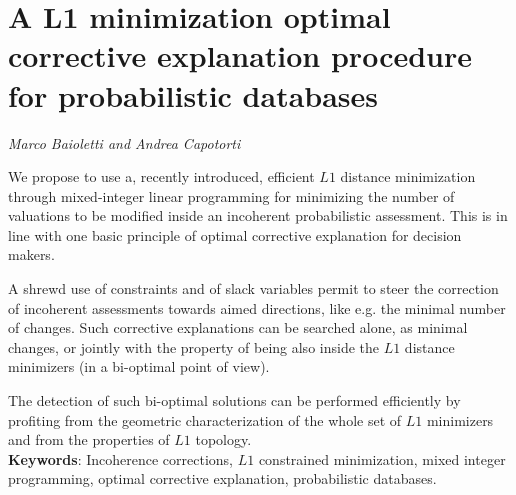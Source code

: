\documentclass[../booklet.tex]{subfiles}
\begin{document}
\section[A  L1 minimization optimal corrective explanation procedure for probabilistic databases. {\it Marco Baioletti and Andrea Capotorti}]{A  L1 minimization optimal corrective explanation procedure for probabilistic databases}
 

\begin{center}
  {\it Marco Baioletti and Andrea Capotorti}
\end{center}

\vskip 0.8cm


We propose to use a, recently introduced,  efficient $L1$ distance minimization through mixed-integer
linear programming for minimizing the number of valuations to be modified inside an incoherent probabilistic assessment. This is in line with one basic principle of optimal corrective explanation for decision makers.

 A shrewd use of constraints and of slack variables permit to steer the correction of incoherent assessments towards aimed directions, like e.g. the minimal number of changes. Such corrective explanations can be searched alone, as minimal changes, or jointly with the property of being also inside the $L1$ distance minimizers (in a bi-optimal point of view).
 
 The detection of such bi-optimal solutions can be performed efficiently by profiting from the geometric characterization of the whole set of $L1$ minimizers and from the properties of $L1$ topology.
 \\
\textbf{Keywords}: Incoherence corrections, $L1$ constrained minimization, mixed integer programming, optimal corrective explanation, probabilistic databases.
\end{document}
